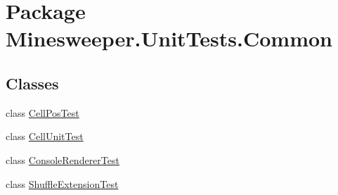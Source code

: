 \hypertarget{namespace_minesweeper_1_1_unit_tests_1_1_common}{\section{Package Minesweeper.\+Unit\+Tests.\+Common}
\label{namespace_minesweeper_1_1_unit_tests_1_1_common}
}
\subsection*{Classes}
\begin{DoxyCompactItemize}
\item 
class \hyperlink{class_minesweeper_1_1_unit_tests_1_1_common_1_1_cell_pos_test}{Cell\+Pos\+Test}
\item 
class \hyperlink{class_minesweeper_1_1_unit_tests_1_1_common_1_1_cell_unit_test}{Cell\+Unit\+Test}
\item 
class \hyperlink{class_minesweeper_1_1_unit_tests_1_1_common_1_1_console_renderer_test}{Console\+Renderer\+Test}
\item 
class \hyperlink{class_minesweeper_1_1_unit_tests_1_1_common_1_1_shuffle_extension_test}{Shuffle\+Extension\+Test}
\end{DoxyCompactItemize}
